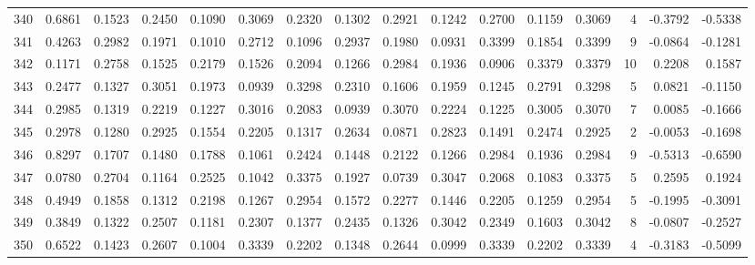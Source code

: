 \begin{tabular}{lrrrrrrrrrrrrrrr}
340 &      0.6861 &  0.1523 &  0.2450 &  0.1090 &  0.3069 &  0.2320 &  0.1302 &  0.2921 &  0.1242 &  0.2700 &   0.1159 &     0.3069 &      4 &                   -0.3792 &                    -0.5338 \\
341 &      0.4263 &  0.2982 &  0.1971 &  0.1010 &  0.2712 &  0.1096 &  0.2937 &  0.1980 &  0.0931 &  0.3399 &   0.1854 &     0.3399 &      9 &                   -0.0864 &                    -0.1281 \\
342 &      0.1171 &  0.2758 &  0.1525 &  0.2179 &  0.1526 &  0.2094 &  0.1266 &  0.2984 &  0.1936 &  0.0906 &   0.3379 &     0.3379 &     10 &                    0.2208 &                     0.1587 \\
343 &      0.2477 &  0.1327 &  0.3051 &  0.1973 &  0.0939 &  0.3298 &  0.2310 &  0.1606 &  0.1959 &  0.1245 &   0.2791 &     0.3298 &      5 &                    0.0821 &                    -0.1150 \\
344 &      0.2985 &  0.1319 &  0.2219 &  0.1227 &  0.3016 &  0.2083 &  0.0939 &  0.3070 &  0.2224 &  0.1225 &   0.3005 &     0.3070 &      7 &                    0.0085 &                    -0.1666 \\
345 &      0.2978 &  0.1280 &  0.2925 &  0.1554 &  0.2205 &  0.1317 &  0.2634 &  0.0871 &  0.2823 &  0.1491 &   0.2474 &     0.2925 &      2 &                   -0.0053 &                    -0.1698 \\
346 &      0.8297 &  0.1707 &  0.1480 &  0.1788 &  0.1061 &  0.2424 &  0.1448 &  0.2122 &  0.1266 &  0.2984 &   0.1936 &     0.2984 &      9 &                   -0.5313 &                    -0.6590 \\
347 &      0.0780 &  0.2704 &  0.1164 &  0.2525 &  0.1042 &  0.3375 &  0.1927 &  0.0739 &  0.3047 &  0.2068 &   0.1083 &     0.3375 &      5 &                    0.2595 &                     0.1924 \\
348 &      0.4949 &  0.1858 &  0.1312 &  0.2198 &  0.1267 &  0.2954 &  0.1572 &  0.2277 &  0.1446 &  0.2205 &   0.1259 &     0.2954 &      5 &                   -0.1995 &                    -0.3091 \\
349 &      0.3849 &  0.1322 &  0.2507 &  0.1181 &  0.2307 &  0.1377 &  0.2435 &  0.1326 &  0.3042 &  0.2349 &   0.1603 &     0.3042 &      8 &                   -0.0807 &                    -0.2527 \\
350 &      0.6522 &  0.1423 &  0.2607 &  0.1004 &  0.3339 &  0.2202 &  0.1348 &  0.2644 &  0.0999 &  0.3339 &   0.2202 &     0.3339 &      4 &                   -0.3183 &                    -0.5099 \\

\end{tabular}
